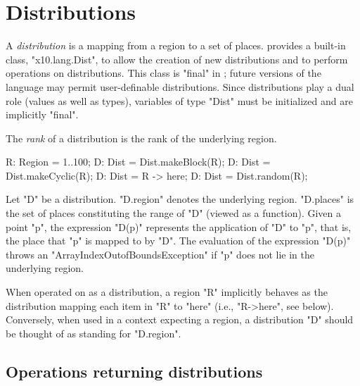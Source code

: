 \section{Distributions}\label{XtenDistributions}

A {\em distribution} is a mapping from a region to a set of places.
{}\Xten{} provides a built-in class, \xcd"x10.lang.Dist", to allow the creation of new distributions and
to perform operations on distributions. This class is \xcd"final" in
{}\XtenCurrVer; future versions of the language may permit
user-definable distributions. Since distributions play a dual role
(values as well as types), variables of type \xcd"Dist" must
be initialized and are implicitly \xcd"final".

The {\em rank} of a distribution is the rank of the underlying region.



\begin{xten}
R: Region = 1..100;
D: Dist = Dist.makeBlock(R);
D: Dist = Dist.makeCyclic(R);
D: Dist = R -> here;
D: Dist = Dist.random(R);
\end{xten}

Let \xcd"D" be a distribution. \xcd"D.region" denotes the underlying
region. \xcd"D.places" is the set of places constituting the range of
\xcd"D" (viewed as a function). Given a point \xcd"p", the expression
\xcd"D(p)" represents the application of \xcd"D" to \xcd"p", that is,
the place that \xcd"p" is mapped to by \xcd"D". The evaluation of the
expression \xcd"D(p)" throws an \xcd"ArrayIndexOutofBoundsException"
if \xcd"p" does not lie in the underlying region.

When operated on as a distribution, a region \xcd"R" implicitly
behaves as the distribution mapping each item in \xcd"R" to \xcd"here"
(i.e., \xcd"R->here", see below). Conversely, when used in a context
expecting a region, a distribution \xcd"D" should be thought of as
standing for \xcd"D.region".

{}

\subsection{Operations returning distributions}

